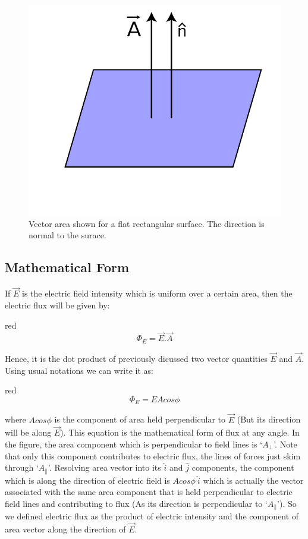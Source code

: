\begin{figure}[H]
  \centering
  \captionsetup{justification = centering}
  \includegraphics[scale = 0.8]{Images/Chapter-11/11.9.png}
  \caption{Vector area shown for a flat rectangular surface. The direction is normal
  to the surace.}
  \label{fig:11.9}
\end{figure}

\subsection*{Mathematical Form}
If $\vec{E}$ is the electric field intensity which is uniform over a certain area,
then the electric flux will be given by:
\begin{mybox}{red}{}
\begin{equation}\label{eq:11.17}
  \Phi_{E}  = \vec{E}.\vec{A}
\end{equation}
\end{mybox}
Hence, it is the dot product of previously dicussed two vector
quantities $\vec{E}$ and $\vec{A}$.
Using usual notations we can write it as:
\begin{mybox}{red}{}
\begin{equation}
  \Phi_{E} = EAcos\phi
\end{equation}
\end{mybox}
where $Acos\phi$ is the component of area held perpendicular to
$\vec{E}$ (But its direction will be along $\vec{E}$).
This equation is the mathematical form of flux at any angle.
In the figure, the area component which is perpendicular
to field lines is  `$A_{\bot}$'. Note that only this component contributes
to electric flux, the lines of forces just skim through `$A_{\parallel}$'.
Resolving area vector into its $\hat{i}$ and $\hat{j}$ components,
the component which is along the direction of electric field is $Acos\phi\:\hat{i}$
which is actually the vector associated with the same area component
that is held perpendicular to electric field lines and contributing
to flux (As its direction is perpendicular to `$A_{\parallel}$').
So we defined electric flux as the product of electric
intensity and the component of area vector along the direction of $\vec{E}$.

